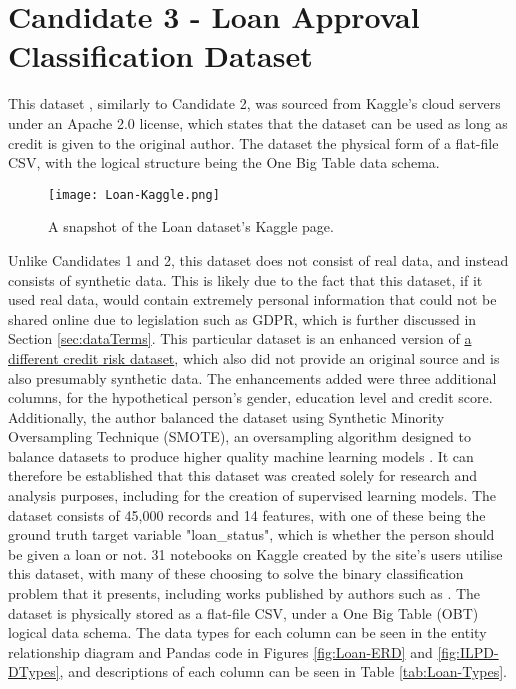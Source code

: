 \section{Candidate 3 - Loan Approval Classification Dataset}\label{sec:Dataset}
This dataset \autocite{lo_loan_nodate}, similarly to Candidate 2, was sourced from Kaggle's cloud servers under 
an Apache 2.0 license, which states that the dataset can be used as long as credit is given to the original author.
The dataset the physical form of a flat-file CSV, with the logical structure being the One Big Table data 
schema. 

\begin{figure}[H]
    \centering
    \texttt{[image: Loan-Kaggle.png]}
    \caption{A snapshot of the Loan dataset's Kaggle page.}
    \label{fig:Loan-Kaggle}
\end{figure}

Unlike Candidates 1 and 2, this dataset does not consist of real data, and 
instead consists of synthetic data. This is likely due to the fact that this dataset, if it used real data, would contain extremely personal 
information that could not be shared online due to legislation such as GDPR, which is further discussed in Section \ref{sec:dataTerms}. This particular dataset is an enhanced version of \href{https://www.kaggle.com/datasets/laotse/credit-risk-dataset}{a different credit risk dataset},
which also did not provide an original source and is also presumably synthetic data. The enhancements added were three additional 
columns, for the hypothetical person's gender, education level and credit score. Additionally, the author balanced the dataset using 
Synthetic Minority Oversampling Technique (SMOTE), an oversampling algorithm designed to balance datasets to produce higher
quality machine learning models \autocite{microsoft_smote_2024}.
It can therefore be established that this dataset was created solely for research and analysis purposes, including 
for the creation of supervised learning models. The dataset consists of 45,000 records and 14 features, with 
one of these being the ground truth target variable "loan\_status", which is whether the person should be given a loan or not. 
31 notebooks on Kaggle created by the site's users utilise this dataset, with many of these choosing to solve the binary classification 
problem that it presents, including works published by authors such as \autocite{gupta_loanification_2021}. 
The dataset is physically stored as a flat-file CSV, under a One Big Table (OBT) logical data schema.
The data types for each column can be seen in the entity relationship diagram and Pandas code in Figures \ref{fig:Loan-ERD} and \ref{fig:ILPD-DTypes}, and 
descriptions of each column can be seen in Table \ref{tab:Loan-Types}.

